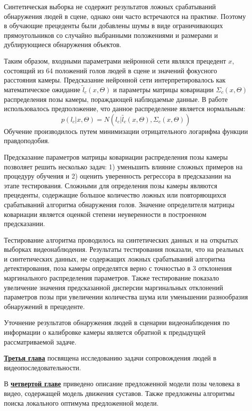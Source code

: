 Синтетическая выборка не содержит результатов ложных срабатываний обнаружения людей в сцене, однако они часто встречаются на практике. Поэтому в обучающие прецеденты были добавлены шумы в виде ограничивающих прямоугольников со случайно выбранными положениями и размерами и дублирующиеся обнаружения объектов.

Таким образом, входными параметрами нейронной сети являлся прецедент $x$, состоящий из 64 положений голов людей в сцене и значений фокусного расстояния камеры. Предсказание нейронной сети интерпретировалось как математическое ожидание $\tilde{l}_c(x, \Theta)$ и параметры матрицы ковариации $\Sigma_c(x, \Theta)$ распределения позы камеры, пораждающей наблюдаемые данные. В работе использовалось предположение, что данное распределение является нормальным:
\begin{equation}
	p(l_{c}|x, \Theta) = N(l_c|\tilde{l_c}(x, \Theta), \Sigma_c(x, \Theta))
\end{equation}
Обучение производилось путем минимизации отрицательного логарифма функции правдоподобия.

Предсказание параметров матрицы ковариации распределения позы камеры позволяет решить несколько задач: 1) уменьшить влияние сложных примеров на процедуру обучения и 2) оценить уверенность регрессора в предсказании на этапе тестирования. Сложными для определения позы камеры являются прецеденты, содержащие большое количество ложных или повторяющихся срабатываний алгоритма обнаружения голов. Значение определителя матрицы ковариации является оценкой степени неуверенности в построенном предсказании.

Тестирование алгоритма проводилось на синтетических данных и на открытых выборках видеонаблюдения. Результаты тестирования показали, что на реальных и синтетических данных, не содержащих ложных срабатываний алгоритма детектирования, поза камеры определятся верно с точностью в 3 отклонения маргинального распределения параметров. Также тестирование показало увеличение значения предсказанной дисперсии маргинальных отклонений параметров позы при увеличении количества шума или уменьшении разнообразия обнаружений в прецеденте.

Уточнение результатов обнаружения людей в сценарии видеонаблюдения по информации о калибровке камеры является обратной к предыдущей рассматриваемой задаче.

\underline{\textbf{Третья глава}} посвящена исследованию задачи сопровождения людей в видеопоследовательности.

В \underline{\textbf{четвертой главе}} приведено описание предложенной модели позы человека в видео, содержащей модель движения суставов. Также предложены алгоритмы поиска локального оптимума предложенной модели.

